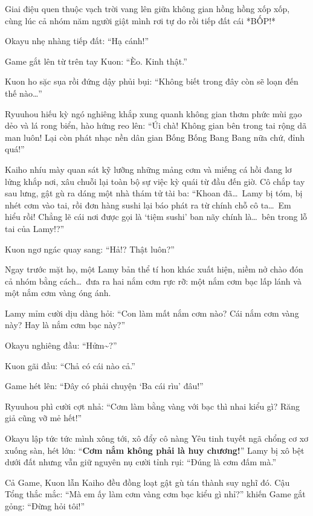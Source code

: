 \documentclass[../main.tex]{subfiles}
\begin{document}
Giai điệu quen thuộc vạch trời vang lên giữa không gian hồng hồng xốp xốp, cùng lúc cả nhóm năm người giật mình rơi tự do rồi tiếp đất cái *BỐP!*

Okayu nhẹ nhàng tiếp đất: ``Hạ cánh!''

Game gắt lên từ trên tay Kuon: ``Èo. Kinh thật.''

Kuon ho sặc sụa rồi đứng dậy phủi bụi: ``Không biết trong đây còn sẽ loạn đến thế nào\dots''

Ryuuhou hiếu kỳ ngó nghiêng khắp xung quanh không gian thơm phức mùi gạo dẻo và lá rong biển, hào hứng reo lên: ``Úi chà! Không gian bên trong tai rộng dã man luôn! Lại còn phát nhạc nền dân gian Bống Bống Bang Bang nữa chứ, đỉnh quá!''

Kaiho nhíu mày quan sát kỹ lưỡng những mảng cơm và miếng cá hồi đang lơ lửng khắp nơi, xâu chuỗi lại toàn bộ sự việc kỳ quái từ đầu đến giờ. Cô chắp tay sau lưng, gật gù ra dáng một nhà thám tử tài ba: ``Khoan đã\dots\ Lamy bị tóm, bị nhét cơm vào tai, rồi đơn hàng sushi lại báo phát ra từ chính chỗ cô ta\dots\ Em hiểu rồi! Chẳng lẽ cái nơi được gọi là `tiệm sushi' ban nãy chính là\dots\ bên trong lỗ tai của Lamy!?''

Kuon ngơ ngác quay sang: ``Hả!? Thật luôn?''

Ngay trước mặt họ, một Lamy bản thể tí hon khác xuất hiện, niềm nở chào đón cả nhóm bằng cách\dots\ đưa ra hai nắm cơm rực rỡ: một nắm cơm bạc lấp lánh và một nắm cơm vàng óng ánh.


Lamy mỉm cười dịu dàng hỏi: ``Con làm mất nắm cơm nào? Cái nắm cơm vàng này? Hay là nắm cơm bạc này?''

Okayu nghiêng đầu: ``Hửm\~{}?''

Kuon gãi đầu: ``Chả có cái nào cả.''

Game hét lên: ``Đây có phải chuyện `Ba cái rìu' đâu!''

Ryuuhou phì cười cợt nhả: ``Cơm làm bằng vàng với bạc thì nhai kiểu gì? Răng giả cũng vỡ mẻ hết!''

Okayu lập tức tức mình xông tới, xô đẩy cô nàng Yêu tinh tuyết ngã chổng cơ xơ xuống sàn, hét lớn: ``\textbf{Cơm nắm không phải là huy chương!}'' Lamy bị xô bệt dưới đất nhưng vẫn giữ nguyên nụ cười tỉnh rụi: ``Đúng là cơm đấm mà.''

Cả Game, Kuon lẫn Kaiho đều đồng loạt gật gù tán thành suy nghĩ đó. Cậu Tổng thắc mắc: ``Mà em ấy làm cơm vàng cơm bạc kiểu gì nhỉ?'' khiến Game gắt gỏng: ``Đừng hỏi tôi!''
\end{document}
